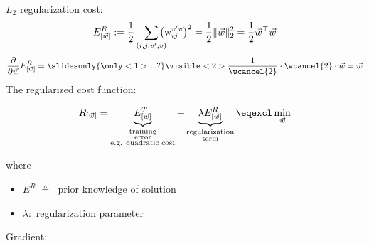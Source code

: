 \begin{frame}

$L_2$ regularization cost:
\begin{equation}
E^R_{[\vec w]} := \frac{1}{2} \sum_{(i, j, v', v)} 
			\kern-2ex
			\big( \mathrm{w}_{ij}^{v'v} \big)^2 = \frac{1}{2} \lVert \vec w \rVert_2^2 = \frac{1}{2} \vec w^\top \vec w 
\end{equation}
\renewcommand{\CancelColor}{\color{gray}}
\begin{equation}
\frac{\partial}{\partial \vec w} E^R_{[\vec w]} = \slidesonly{\only<1>{...?}}\visible<2>{
\frac{1}{\wcancel{2}} \cdot \wcancel{2} \cdot \vec w = \vec w
}
\end{equation}
\pause
The regularized cost function:

\begin{equation}
	R_{[\vec{w}]} = \underbrace{ E_{[\vec{w}]}^T }_{
			\substack{\text{training} \\ \text{error} \\ \text{e.g. quadratic cost}}}
		+ \underbrace{ \lambda E_{[\vec{w}]}^R }_{
			\substack{\text{regularization} \\ \text{term}}}
		\eqexcl \min_{\vec w}
\end{equation}

where 
\begin{itemize}
	\item $E^R \; \corresponds \; $ prior knowledge of solution
	\item $\lambda:$ regularization parameter 
\end{itemize}
\end{frame}

\begin{frame}
Gradient:

\end{frame}
